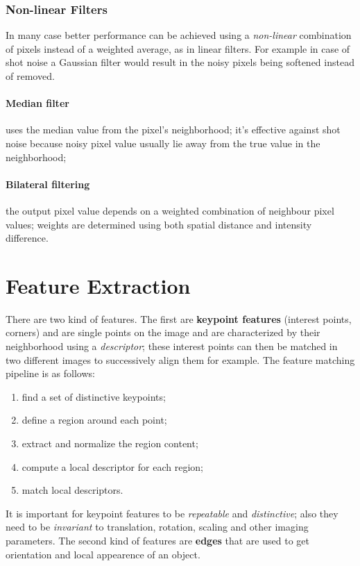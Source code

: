 \documentclass[a4paper,twocolumn]{article}
\begin{document}
\subsubsection{Non-linear Filters}
In many case better performance can be achieved using a \textit{non-linear}
combination of pixels instead of a weighted average, as in linear filters. For
example in case of shot noise a Gaussian filter would result in the noisy pixels
being softened instead of removed.
\paragraph{Median filter} uses the median value from the pixel's neighborhood;
it's effective against shot noise because noisy pixel value usually lie away from
the true value in the neighborhood;
\paragraph{Bilateral filtering} the output pixel value depends on a weighted
combination of neighbour pixel values; weights are determined using both spatial
distance and intensity difference.


\section{Feature Extraction}
There are two kind of features. The first are \textbf{keypoint features} (interest points,
corners) and are single points on the image and are
characterized by their neighborhood using a \textit{descriptor}; these interest
points can then be matched in two different images to successively align them
for example. The feature matching pipeline is as follows:
\begin{enumerate}
  \item find a set of distinctive keypoints;
  \item define a region around each point;
  \item extract and normalize the region content;
  \item compute a local descriptor for each region;
  \item match local descriptors.
\end{enumerate}
It is important for keypoint features to be \textit{repeatable} and
\textit{distinctive}; also they need to be \textit{invariant} to translation,
rotation, scaling and other imaging parameters.
The second kind of features are \textbf{edges} that are used to get
orientation and local appearence of an object.
\end{document}

